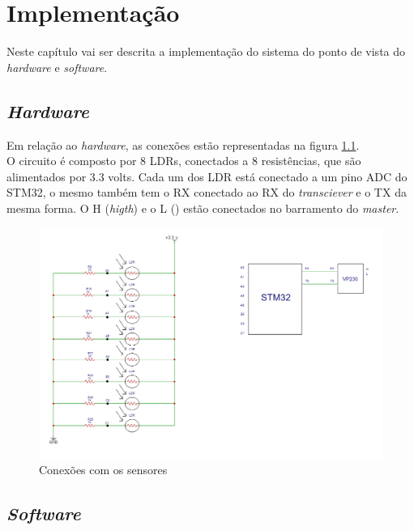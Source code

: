 \chapter{Implementação}

Neste capítulo vai ser descrita a implementação do sistema do ponto de vista do \textit{hardware} e \textit{software}.


\section{\textit{Hardware}}

Em relação ao \textit{hardware}, as conexões estão representadas na figura \ref{hard}.
\\O circuito é composto por 8 LDRs, conectados a 8 resistências, que são alimentados por 3.3 volts. Cada um dos LDR está conectado a um pino ADC do STM32, o mesmo também tem o RX conectado ao RX do \textit{transciever} e o TX da mesma forma. O H (\textit{higth}) e o L () estão conectados no barramento do \textit{master}.

\begin{figure}[!htb]
\centering
\includegraphics[scale=0.55]{Figuras/circuito.PNG}
\caption{Conexões com os sensores}
\label{hard}
\end{figure}

\newpage

\section{\textit{Software}}

